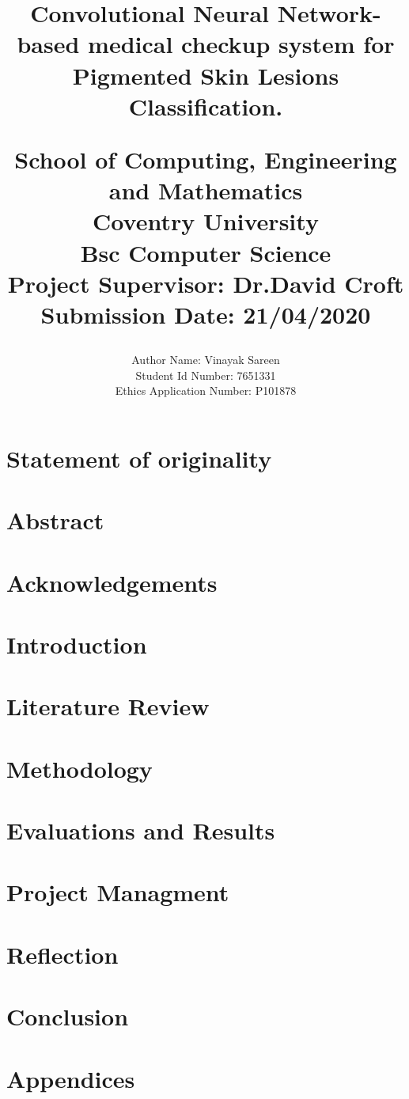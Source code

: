 \documentclass[14pts]{report}
\title{
	\begin{center}
	{Convolutional Neural Network-based medical checkup system for Pigmented Skin Lesions Classification.} \\
	\vspace{5mm} %
	
	\large {
		{School of Computing, Engineering and Mathematics}\\
		{Coventry University}\\
	}
	\vspace{3mm} %
	\textbf{ Bsc Computer Science}\\
	{\large Project Supervisor: Dr.David Croft}\\
	{\large Submission Date: 21/04/2020} \\
	\end{center}
}
\author{
	{\large Author Name:  Vinayak Sareen} \\
	{\large Student Id Number:  7651331} \\
	{\large Ethics Application Number: P101878 }\\
}
\date{}
\begin{document}
\maketitle

\chapter*{Statement of originality}


\chapter*{Abstract}


\tableofcontents

\chapter*{Acknowledgements}


\chapter{Introduction}


\chapter{Literature Review}


\chapter{Methodology}


\chapter{Evaluations and Results}


\chapter{Project Managment}


\chapter{Reflection}


\chapter{Conclusion}





\chapter{Appendices}

\end{document}
